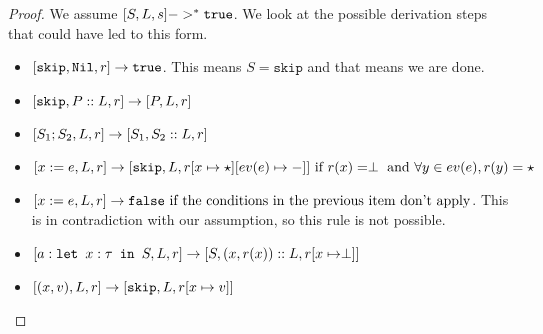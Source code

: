 \begin{proof}
We assume $[ S, L, s ] ->^* \texttt{true}$. We look at the possible derivation steps that could have led to this form. 
\begin{itemize}
    \item $[ \texttt{skip}, \texttt{Nil}, r ] \to \texttt{true}$. This means $S = \texttt{skip}$ and that means we are done.
    \item $[ \texttt{skip}, P::L,  r ] \to [ P, L, r ]$
    \item $[ S_1; S_2, L, r ] \to [ S_1, S_2::L, r ]$
    \item $[ x:=e, L, r ] \to [ \texttt{skip}, L, r[x\mapsto \star][ev(e) \mapsto -] ] \textrm{ if }r(x) = \perp \textrm{ and } \forall y \in ev(e), r(y) = \star$
    \item $[ x:=e, L, r ] \to \texttt{false} \textrm{  if the conditions in the previous item don't apply}$. This is in contradiction with our assumption, so this rule is not possible. 
    \item $[ a : \texttt{let }x : \tau \texttt{ in } S, L, r ] \to [ S, (x,r(x))::L, r[x\mapsto \perp] ]$
    \item $[ (x,v), L, r ] \to [ \texttt{skip}, L, r[x \mapsto v] ]$
\end{itemize}
\end{proof}




